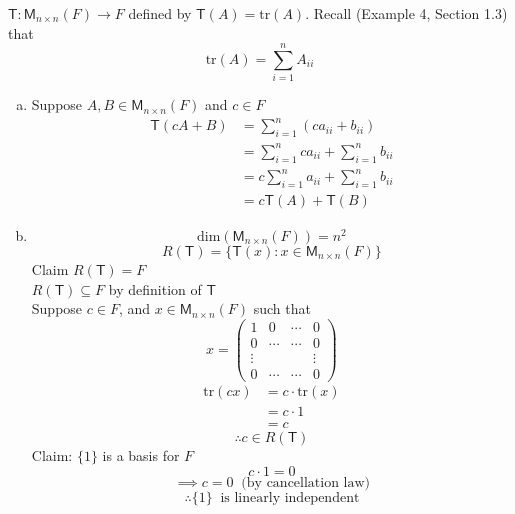 $\mathsf{T}\colon\mathsf{M}_{n\times n}(F) \to F$ defined by
$\mathsf{T}(A) = \text{tr}(A)$. Recall (Example 4, Section 1.3) that
\[
\text{tr}(A) = \sum\limits_{i=1}^n A_{ii}
\]
\begin{enumerate}[(a)]
\item Suppose $A,B \in \mathsf{M}_{n\times n}(F)$ and $c\in F$
\begin{align}
\mathsf{T}(cA +B) &= \sum\limits_{i=1}^n(ca_{ii}+b_{ii})\\
&=\sum\limits_{i=1}^nca_{ii}+\sum\limits_{i=1}^nb_{ii}\\
&=c\sum\limits_{i=1}^na_{ii}+\sum\limits_{i=1}^nb_{ii}\\
&= c\mathsf{T}(A) + \mathsf{T}(B)
\end{align}
\item 
\begin{equation}
\text{dim}(\mathsf{M}_{n\times n}(F)) = n^2
\end{equation}
\begin{equation}
R(\mathsf{T}) =\{\mathsf{T}(x) \colon x \in \mathsf{M}_{n\times n}(F)\}
\end{equation}
Claim $R(\mathsf{T}) =F $
\\$R(\mathsf{T})\subseteq F$ by definition of $\mathsf{T}$
\\Suppose $c \in F$, and  $x \in \mathsf{M}_{n\times n}(F)$ such that 
\[
x = \begin{pmatrix}
1& 0 &\cdots & 0\\
0 & \cdots &\cdots& 0\\
\vdots & & &\vdots\\
0 & \cdots & \cdots& 0 
\end{pmatrix}
\]
\begin{align}
\text{tr}(cx) &= c\cdot\text{tr}(x) \\
&= c \cdot 1 \\
&= c
\end{align}
\begin{equation}
\therefore c \in R(\mathsf{T})
\end{equation}
Claim: $\{1\}$ is a basis for $F$
\begin{equation}
c \cdot 1 = 0
\end{equation}
\begin{equation}
\implies c = 0\;\; \text{(by cancellation law)}
\end{equation}
\begin{equation}
\therefore \{1\}\;\; \text{is linearly independent}
\end{equation}

\end{enumerate}
